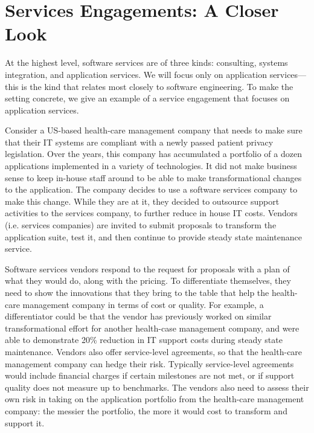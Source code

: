 \section{Services Engagements: A Closer Look}

At the highest level, software services are of three kinds: consulting, systems integration, and application services. We will focus only on application services---this is the kind that relates most closely to software engineering.  To make the setting concrete, we give an example of a service engagement that focuses on application services. 

Consider a US-based health-care management company that needs to make sure that their IT systems are compliant with a newly passed patient privacy legislation. Over the years, this company has accumulated a portfolio of a dozen applications implemented in a variety of technologies. It did not make business sense to keep in-house staff around to be able to make transformational changes to the application. The company decides to use a software services company to make this change. While they are at it, they decided to outsource support activities to the services company, to further reduce in house IT costs.  Vendors (i.e. services companies) are invited to submit proposals to transform the application suite, test it, and then continue to provide steady state maintenance service.

Software services vendors respond to the request for proposals with a plan of what they would do, along with the pricing. To differentiate themselves, they need to show the innovations that they bring to the table that help the health-care management company in terms of cost or quality. For example, a differentiator could be that the vendor has previously worked on similar transformational effort for another health-case management company, and were able to demonstrate 20\% reduction in IT support costs during steady state maintenance. Vendors also offer service-level agreements, so that the health-care management company can hedge their risk.  Typically service-level agreements would include financial charges if certain milestones are not met, or if support quality does not measure up to benchmarks. The vendors also need to assess their own risk in taking on the application portfolio from the health-care management company: the messier the portfolio, the more it would cost to transform and support it.

